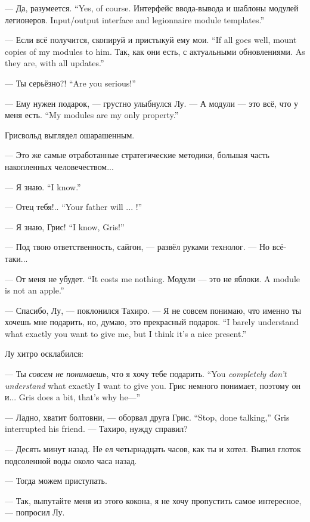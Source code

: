 {--- Да, разумеется.}
{``Yes, of course.}
{Интерфейс ввода-вывода и шаблоны модулей легионеров.}
{Input/output interface and legionnaire module templates.''}

{--- Если всё получится, скопируй и пристыкуй ему мои.}
{``If all goes well, mount copies of my modules to him.}
{Так, как они есть, с актуальными обновлениями.}
{As they are, with all updates.''}

{--- Ты серьёзно?!}
{``Are you serious!''}

--- Ему нужен подарок, --- грустно улыбнулся Лу.
{--- А модули --- это всё, что у меня есть.}
{``My modules are my only property.''}

Грисвольд выглядел ошарашенным.

--- Это же самые отработанные стратегические методики, большая часть накопленных человечеством...

{--- Я знаю.}
{``I know.''}

{--- Отец тебя!..}
{``Your father will ... !''}

{--- Я знаю, Грис!}
{``I know, Gris!''}

--- Под твою ответственность, сайгон, --- развёл руками технолог.
--- Но всё-таки...

{--- От меня не убудет.}
{``It costs me nothing.}
{Модули --- это не яблоки.}
{A module is not an apple.''}

--- Спасибо, Лу, --- поклонился Тахиро.
{--- Я не совсем понимаю, что именно ты хочешь мне подарить, но, думаю, это прекрасный подарок.}
{``I barely understand what exactly you want to give me, but I think it's a nice present.''}

Лу хитро осклабился:

{--- Ты \emph{совсем не понимаешь}, что я хочу тебе подарить.}
{``You \emph{completely don't understand} what exactly I want to give you.}
{Грис немного понимает, поэтому он и...}
{Gris does a bit, that's why he---''}

{--- Ладно, хватит болтовни, --- оборвал друга Грис.}
{``Stop, done talking,'' Gris interrupted his friend.}
--- Тахиро, нужду справил?

--- Десять минут назад.
Не ел четырнадцать часов, как ты и хотел.
Выпил глоток подсоленной воды около часа назад.

--- Тогда можем приступать.

--- Так, выпутайте меня из этого кокона, я не хочу пропустить самое интересное, --- попросил Лу.

